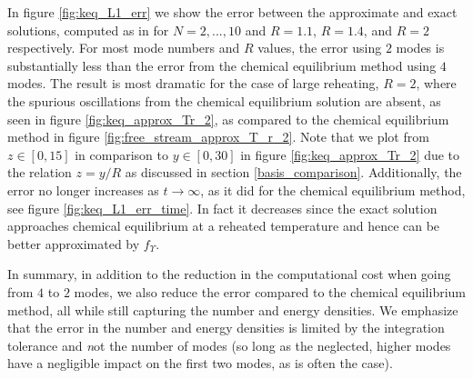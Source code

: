 In figure \ref{fig:keq_L1_err} we show the error between the approximate and exact solutions, computed as in  for $N=2,...,10$ and $R=1.1$, $R=1.4$, and $R=2$ respectively.  For most mode numbers and $R$ values, the error using $2$ modes is substantially less than the error from the chemical equilibrium method using $4$ modes.  The result is most dramatic for the case of large reheating, $R=2$, where the spurious oscillations from the chemical equilibrium solution are absent, as seen in figure \ref{fig:keq_approx_Tr_2}, as compared to the chemical equilibrium method in figure \ref{fig:free_stream_approx_T_r_2}.  Note that we plot from $z\in [0,15]$ in comparison to $y\in[0,30]$ in figure \ref{fig:keq_approx_Tr_2} due to the relation $z=y/R$ as discussed in section \ref{basis_comparison}. Additionally, the error no longer increases as $t\rightarrow\infty$, as it did for the chemical equilibrium method, see figure \ref{fig:keq_L1_err_time}.  In fact it decreases since the exact solution approaches chemical equilibrium at a reheated temperature and hence can be better approximated by $f_\Upsilon$. 

In summary, in addition to the reduction in the computational cost when going from $4$ to $2$ modes, we also reduce the error compared to the chemical equilibrium method, all while still capturing the number and energy densities.  We emphasize that the error in the number and energy densities is limited by the integration tolerance and {\emph not} the number of modes (so long as the neglected, higher modes have a negligible impact on the first two modes, as is often the case).  

